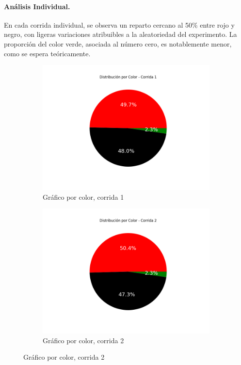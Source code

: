 \documentclass{article}
\begin{document}
\paragraph{Análisis Individual.}
En cada corrida individual, se observa un reparto cercano al 50\% entre rojo y negro, con ligeras variaciones atribuibles a la aleatoriedad del experimento. La proporción del color verde, asociada al número cero, es notablemente menor, como se espera teóricamente.
\begin{figure}[H]
    \centering
    \begin{subfigure}[b]{0.45\textwidth}
        \centering
        \includegraphics[width=\textwidth]{Imagenes/GraficoColor_corrida_1.png}
        \caption{Gráfico por color, corrida 1}
    \end{subfigure}
    \hfill
    \begin{subfigure}[b]{0.45\textwidth}
        \centering
        \includegraphics[width=\textwidth]{Imagenes/GraficoColor_corrida_2.png}
        \caption{Gráfico por color, corrida 2}
    \end{subfigure}
    

\end{figure}
\end{document}
